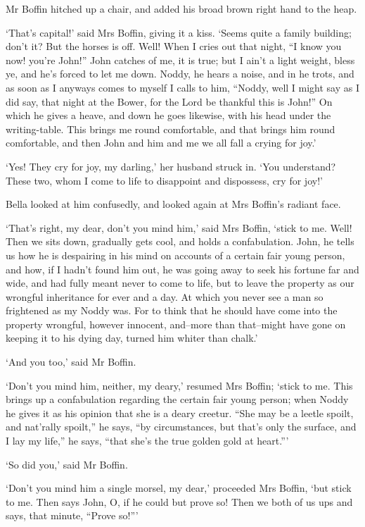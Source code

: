 Mr Boffin hitched up a chair, and added his broad brown right hand to
the heap.

‘That’s capital!’ said Mrs Boffin, giving it a kiss. ‘Seems quite a
family building; don’t it? But the horses is off. Well! When I cries
out that night, “I know you now! you’re John!” John catches of me, it
is true; but I ain’t a light weight, bless ye, and he’s forced to let me
down. Noddy, he hears a noise, and in he trots, and as soon as I anyways
comes to myself I calls to him, “Noddy, well I might say as I did say,
that night at the Bower, for the Lord be thankful this is John!” On
which he gives a heave, and down he goes likewise, with his head under
the writing-table. This brings me round comfortable, and that brings him
round comfortable, and then John and him and me we all fall a crying for
joy.’

‘Yes! They cry for joy, my darling,’ her husband struck in. ‘You
understand? These two, whom I come to life to disappoint and dispossess,
cry for joy!’

Bella looked at him confusedly, and looked again at Mrs Boffin’s radiant
face.

‘That’s right, my dear, don’t you mind him,’ said Mrs Boffin, ‘stick
to me. Well! Then we sits down, gradually gets cool, and holds a
confabulation. John, he tells us how he is despairing in his mind on
accounts of a certain fair young person, and how, if I hadn’t found him
out, he was going away to seek his fortune far and wide, and had fully
meant never to come to life, but to leave the property as our wrongful
inheritance for ever and a day. At which you never see a man so
frightened as my Noddy was. For to think that he should have come into
the property wrongful, however innocent, and--more than that--might have
gone on keeping it to his dying day, turned him whiter than chalk.’

‘And you too,’ said Mr Boffin.

‘Don’t you mind him, neither, my deary,’ resumed Mrs Boffin; ‘stick
to me. This brings up a confabulation regarding the certain fair young
person; when Noddy he gives it as his opinion that she is a deary
creetur. “She may be a leetle spoilt, and nat’rally spoilt,” he says,
“by circumstances, but that’s only the surface, and I lay my life,” he
says, “that she’s the true golden gold at heart.”’

‘So did you,’ said Mr Boffin.

‘Don’t you mind him a single morsel, my dear,’ proceeded Mrs Boffin,
‘but stick to me. Then says John, O, if he could but prove so! Then we
both of us ups and says, that minute, “Prove so!”’

